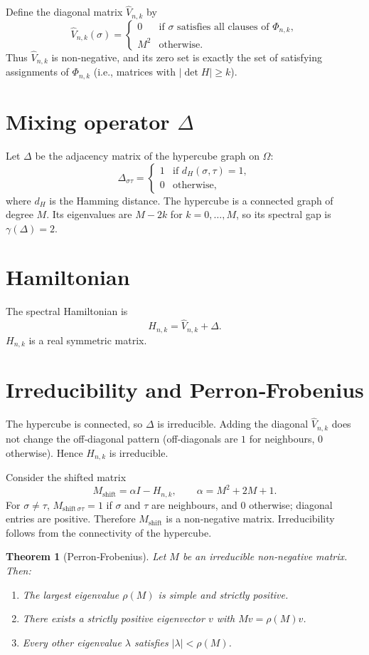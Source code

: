 \documentclass[11pt,a4paper]{article}
\newtheorem{theorem}{Theorem}[section]
\begin{document}
Define the diagonal matrix $\hat{V}_{n,k}$ by
\[
\hat{V}_{n,k}(\sigma) = \begin{cases}
0 & \text{if }\sigma\text{ satisfies all clauses of } \Phi_{n,k},\\
M^2 & \text{otherwise}.
\end{cases}
\]
Thus $\hat{V}_{n,k}$ is non‑negative, and its zero set is exactly the set of satisfying assignments of $\Phi_{n,k}$ (i.e., matrices with $|\det H| \ge k$).

\section{Mixing operator $\Delta$}

Let $\Delta$ be the adjacency matrix of the hypercube graph on $\Omega$:
\[
\Delta_{\sigma\tau} = \begin{cases}
1 & \text{if } d_H(\sigma,\tau)=1,\\
0 & \text{otherwise},
\end{cases}
\]
where $d_H$ is the Hamming distance. The hypercube is a connected graph of degree $M$. Its eigenvalues are $M-2k$ for $k=0,\dots,M$, so its spectral gap is $\gamma(\Delta)=2$.

\section{Hamiltonian}

The spectral Hamiltonian is
\[
H_{n,k} = \hat{V}_{n,k} + \Delta.
\]
$H_{n,k}$ is a real symmetric matrix.

\section{Irreducibility and Perron‑Frobenius}

The hypercube is connected, so $\Delta$ is irreducible. Adding the diagonal $\hat{V}_{n,k}$ does not change the off‑diagonal pattern (off‑diagonals are $1$ for neighbours, $0$ otherwise). Hence $H_{n,k}$ is irreducible.

Consider the shifted matrix
\[
M_{\text{shift}} = \alpha I - H_{n,k},\qquad \alpha = M^2 + 2M + 1.
\]
For $\sigma\neq\tau$, $M_{\text{shift}\,\sigma\tau} = 1$ if $\sigma$ and $\tau$ are neighbours, and $0$ otherwise; diagonal entries are positive. Therefore $M_{\text{shift}}$ is a non‑negative matrix. Irreducibility follows from the connectivity of the hypercube.

\begin{theorem}[Perron‑Frobenius]
Let $M$ be an irreducible non‑negative matrix. Then:
\begin{enumerate}
\item The largest eigenvalue $\rho(M)$ is simple and strictly positive.
\item There exists a strictly positive eigenvector $v$ with $Mv = \rho(M)v$.
\item Every other eigenvalue $\lambda$ satisfies $|\lambda| < \rho(M)$.
\end{enumerate}
\end{theorem}
\end{document}
